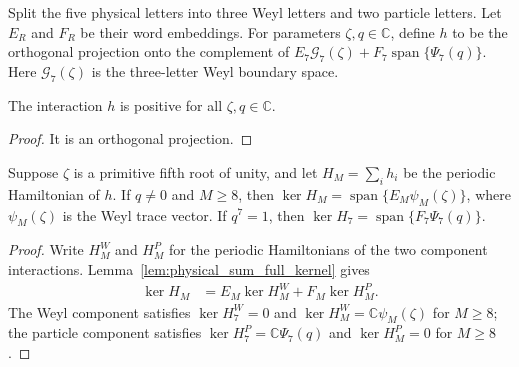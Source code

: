 \begin{definition}
    \label{def:seven_sector_interaction}
    \leanok
    Split the five physical letters into three Weyl letters and two particle
    letters. Let $E_R$ and $F_R$ be their word embeddings. For parameters
    $\zeta,q\in\mathbb C$, define $h$ to be the orthogonal projection onto
    the complement of
    $E_7\mathcal G_7(\zeta)+F_7\operatorname{span}\{\Psi_7(q)\}$.
    Here $\mathcal G_7(\zeta)$ is the three-letter Weyl boundary space.
\end{definition}

\begin{lemma}
    \label{lem:seven_sector_interaction_positive}
    \leanok
    The interaction $h$ is positive for all $\zeta,q\in\mathbb C$.
\end{lemma}
\begin{proof}
    \leanok
    It is an orthogonal projection.
\end{proof}

\begin{lemma}
    \label{lem:seven_sector_periodic_kernels}
    \leanok
    Suppose $\zeta$ is a primitive fifth root of unity, and let
    $H_M=\sum_i h_i$ be the periodic Hamiltonian of $h$.
    If $q\ne0$ and $M\ge8$, then
    $\ker H_M=\operatorname{span}\{E_M\psi_M(\zeta)\}$, where
    $\psi_M(\zeta)$ is the Weyl trace vector.
    If $q^7=1$, then
    $\ker H_7=\operatorname{span}\{F_7\Psi_7(q)\}$.
\end{lemma}
\begin{proof}
    \leanok
    Write $H^{W}_M$ and $H^{P}_M$ for the periodic Hamiltonians of the
    two component interactions. Lemma~\ref{lem:physical_sum_full_kernel}
    gives
    \begin{align}
        \ker H_M & =E_M\ker H^{W}_M+F_M\ker H^{P}_M.
    \end{align}
    The Weyl component satisfies $\ker H^{W}_7=0$ and
    $\ker H^{W}_M=\mathbb C\psi_M(\zeta)$ for $M\ge8$; the particle
    component satisfies $\ker H^{P}_7=\mathbb C\Psi_7(q)$ and
    $\ker H^{P}_M=0$ for $M\ge8$.
\end{proof}

